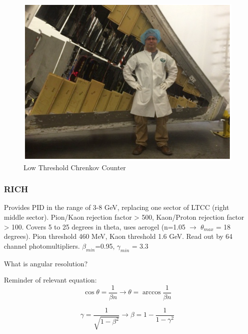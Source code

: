             
						
									
			 \begin{figure}[H]
    			\centering
    			\includegraphics[width=12cm]{Chapters/Ch2-Experiment/clas-12-system/pics/fd/ltcc.PNG}
    			\caption{Low Threshold Chrenkov Counter}
			\end{figure}
			
			

			
        \subsubsection{RICH}
            Provides PID in the range of 3-8 GeV, replacing one sector of LTCC (right middle sector). Pion/Kaon rejection factor > 500, Kaon/Proton rejection factor > 100. Covers 5 to 25 degrees in theta, uses aerogel (n=1.05 $\longrightarrow$ $\theta_{max}$ = 18 degrees). Pion threshold 460 MeV, Kaon threshold 1.6 GeV. Read out by 64 channel photomultipliers. $\beta_{min}$=0.95, $\gamma_{min}$ = 3.3
            
            What is angular resolution?
            
            Reminder of relevant equation:
            \begin{equation}
                \cos{\theta} = \frac{1}{\beta n} \longrightarrow \theta = \arccos{\frac{1}{\beta n}}
            \end{equation}
            
            \begin{equation}
                \gamma = \frac{1}{\sqrt{1-\beta^2}} \longrightarrow \beta = 1-\frac{1}{1-\gamma^2} 
            \end{equation}
            

